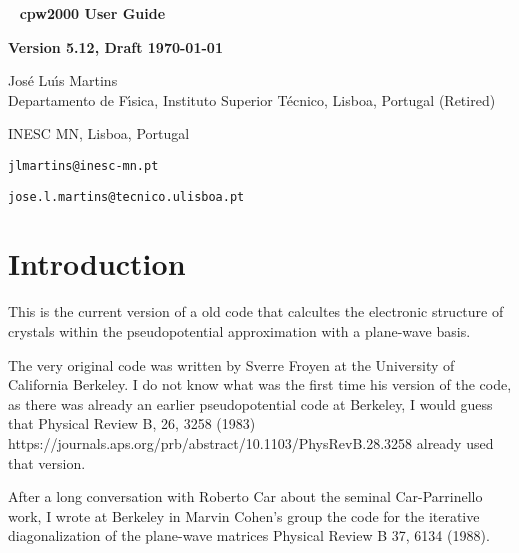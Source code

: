 \documentclass[11pt]{article}
\begin{document}

\begin{titlepage}

\begin{center}
~
\vfill
\vspace{1cm}
{\Huge {\bf cpw2000 User Guide}}
\par\vspace{3cm}
\hrulefill
\par\vspace{3cm}
{\Large {\bf Version 5.12, Draft \today}}
\par\vspace{2cm}
\hrulefill

{\Large Jos\'e Lu\'{\i}s Martins \\
Departamento de F\'{\i}sica, Instituto Superior T\'ecnico, Lisboa, Portugal (Retired)

INESC MN, Lisboa, Portugal

\texttt{jlmartins@inesc-mn.pt}

\texttt{jose.l.martins@tecnico.ulisboa.pt}
}
\vfill
\end{center}

\end{titlepage}

\tableofcontents
\newpage

\section{Introduction}
\label{sec:intro}

This is the current version of a old code that calcultes the electronic structure of crystals
within the pseudopotential approximation with a plane-wave basis.

The very original code was written by Sverre Froyen at the University of California Berkeley.
I do not know what was the first time his version of the code, as there was already an earlier
pseudopotential code at Berkeley, I would guess that
Physical Review B, 26, 3258 (1983) https://journals.aps.org/prb/abstract/10.1103/PhysRevB.28.3258
already used that version.

After a long conversation with Roberto Car about the seminal Car-Parrinello work, I wrote at Berkeley
in Marvin Cohen's group the
code for the iterative diagonalization of the plane-wave matrices
Physical Review B 37, 6134 (1988).
\end{document}
